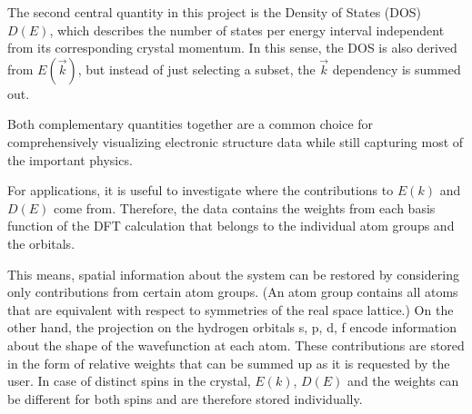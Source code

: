The second central quantity in this project is the Density of States (DOS) $D(E)$, which describes the number of states per energy interval independent from its corresponding crystal momentum. In this sense, the DOS is also derived from $E(\vec{k})$, but instead of just selecting a subset, the $\vec{k}$ dependency is summed out. 

Both complementary quantities together are a common choice for comprehensively visualizing electronic structure data while still capturing most of the important physics. 

For applications, it is useful to investigate where the contributions to $E(k)$ and $D(E)$ come from. Therefore, the data contains the weights from each basis function of the DFT calculation that belongs to the individual atom groups and the orbitals. 

This means, spatial information about the system can be restored by considering only contributions from certain atom groups. (An atom group contains all atoms that are equivalent with respect to symmetries of the real space lattice.) On the other hand, the projection on the hydrogen orbitals s, p, d, f encode information about the shape of the wavefunction at each atom.
These contributions are stored in the form of relative weights that can be summed up as it is requested by the user. In case of distinct spins in the crystal, $E(k)$, $D(E)$ and the weights can be different for both spins and are therefore stored individually.



